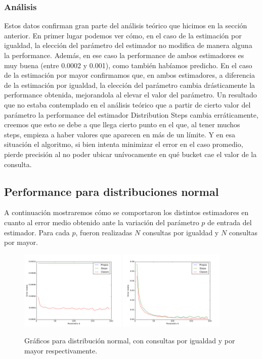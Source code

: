  \subsubsection*{Análisis}
Estos datos confirman gran parte del análisis teórico que hicimos en la sección anterior. En primer lugar podemos ver cómo, en el caso de la estimación por igualdad, la elección del parámetro del estimador no modifica de manera alguna la performance. Además, en ese caso la performance de ambos estimadores es muy buena (entre 0.0002 y 0.001), como también habíamos predicho. En el caso de la estimación por mayor confirmamos que, en ambos estimadores, a diferencia de la estimación por igualdad, la elección del parámetro cambia drásticamente la performance obtenida, mejorandola al elevar el valor del parámetro. Un resultado que no estaba contemplado en el análisis teórico que a partir de cierto valor del parámetro la performance del estimador Distribution Steps cambia erráticamente, creemos que esto se debe a que llega cierto punto en el que, al tener muchos steps, empieza a haber valores que aparecen en más de un límite. Y en esa situación el algoritmo, si bien intenta minimizar el error en el caso promedio, pierde precisión al no poder ubicar unívocamente en qué bucket cae el valor de la consulta.
 
 \subsection{Performance para distribuciones normal}
A continuación mostraremos cómo se comportaron los distintos estimadores en cuanto al error medio obtenido ante la variación del parámetro $p$ de entrada del estimador. Para cada $p$, fueron realizadas $N$ consultas por igualdad y $N$ consultas por mayor.  

\begin{figure}[h!]
  \centering
  \includegraphics[width=0.45\textwidth]{../source/datasets/img/normalEqual}
  \includegraphics[width=0.45\textwidth]{../source/datasets/img/normalGreater}
  \caption{Gráficos para distribución normal, con consultas por igualdad y por mayor respectivamente.}
 \end{figure}

